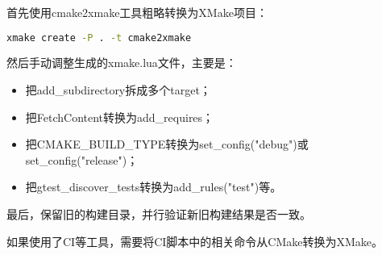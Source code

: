 \documentclass[../main.tex]{subfiles}
\begin{document}
首先使用cmake2xmake工具粗略转换为XMake项目：
\begin{lstlisting}[language=bash]
    xmake create -P . -t cmake2xmake
\end{lstlisting}
然后手动调整生成的xmake.lua文件，主要是：
\begin{itemize}
    \item 把add\_subdirectory拆成多个target；
    \item 把FetchContent转换为add\_requires；
    \item 把CMAKE\_BUILD\_TYPE转换为set\_config("debug")或set\_config("release")；
    \item 把gtest\_discover\_tests转换为add\_rules("test")等。
\end{itemize}
最后，保留旧的构建目录，并行验证新旧构建结果是否一致。

如果使用了CI等工具，需要将CI脚本中的相关命令从CMake转换为XMake。
\end{document}
